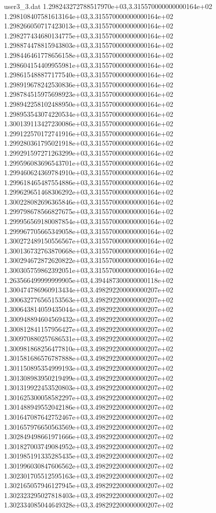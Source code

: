 \begin{filecontents}{user3_3.dat}
1.298243272788517970e+03,3.315570000000000164e+02
1.298108407581613164e+03,3.315570000000000164e+02
1.298266050717423013e+03,3.315570000000000164e+02
1.298277434680134775e+03,3.315570000000000164e+02
1.298874478815943803e+03,3.315570000000000164e+02
1.298446461778656158e+03,3.315570000000000164e+02
1.298604154409955981e+03,3.315570000000000164e+02
1.298615488877177540e+03,3.315570000000000164e+02
1.298919678242530836e+03,3.315570000000000164e+02
1.298784515975698923e+03,3.315570000000000164e+02
1.298942258102488950e+03,3.315570000000000164e+02
1.298953543074220534e+03,3.315570000000000164e+02
1.300139113427230086e+03,3.315570000000000164e+02
1.299122570172741916e+03,3.315570000000000164e+02
1.299280361795021918e+03,3.315570000000000164e+02
1.299291597271263299e+03,3.315570000000000164e+02
1.299596083696543701e+03,3.315570000000000164e+02
1.299460624369784910e+03,3.315570000000000164e+02
1.299618465487554886e+03,3.315570000000000164e+02
1.299629651468306292e+03,3.315570000000000164e+02
1.300228082696365846e+03,3.315570000000000164e+02
1.299798678566827675e+03,3.315570000000000164e+02
1.299956569180087854e+03,3.315570000000000164e+02
1.299967705665349058e+03,3.315570000000000164e+02
1.300272489150556567e+03,3.315570000000000164e+02
1.300136732763870668e+03,3.315570000000000164e+02
1.300294672872620822e+03,3.315570000000000164e+02
1.300305759862392051e+03,3.315570000000000164e+02
1.263566499999999905e+03,4.394487300000000118e+02
1.300474786960913434e+03,3.498292200000000207e+02
1.300632776565153563e+03,3.498292200000000207e+02
1.300643814059435044e+03,3.498292200000000207e+02
1.300948894604569432e+03,3.498292200000000207e+02
1.300812841157956427e+03,3.498292200000000207e+02
1.300970880257686531e+03,3.498292200000000207e+02
1.300981868256477810e+03,3.498292200000000207e+02
1.301581686576787888e+03,3.498292200000000207e+02
1.301150895354999193e+03,3.498292200000000207e+02
1.301308983950219499e+03,3.498292200000000207e+02
1.301319922453520803e+03,3.498292200000000207e+02
1.301625300058582297e+03,3.498292200000000207e+02
1.301488949552042186e+03,3.498292200000000207e+02
1.301647087642752467e+03,3.498292200000000207e+02
1.301657976650563569e+03,3.498292200000000207e+02
1.302849498661971666e+03,3.498292200000000207e+02
1.301827003749084952e+03,3.498292200000000207e+02
1.301985191335285435e+03,3.498292200000000207e+02
1.301996030847606562e+03,3.498292200000000207e+02
1.302301705512595163e+03,3.498292200000000207e+02
1.302165057946127945e+03,3.498292200000000207e+02
1.302323295027818403e+03,3.498292200000000207e+02
1.302334085044649328e+03,3.498292200000000207e+02

\end{filecontents}
